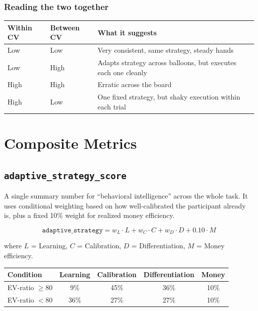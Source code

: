 \documentclass[11pt,a4paper]{article}
\begin{document}
\subsubsection*{Reading the two together}

\begin{table}[H]
\centering
\begin{tabular}{@{}lll@{}}
\toprule
\textbf{Within CV} & \textbf{Between CV} & \textbf{What it suggests} \\
\midrule
Low  & Low  & Very consistent, same strategy, steady hands \\
Low  & High & Adapts strategy across balloons, but executes each one cleanly \\
High & High & Erratic across the board \\
High & Low  & One fixed strategy, but shaky execution within each trial \\
\bottomrule
\end{tabular}
\end{table}


\section{Composite Metrics}

\subsection{\texttt{adaptive\_strategy\_score}}

A single summary number for ``behavioral intelligence'' across the whole
task. It uses conditional weighting based on how well-calibrated the
participant already is, plus a fixed 10\% weight for realized money
efficiency.

\begin{equation}
\boxed{
\texttt{adaptive\_strategy} =
w_L \!\cdot\! L
+ w_C \!\cdot\! C
+ w_D \!\cdot\! D
+ 0.10 \!\cdot\! M
}
\end{equation}

where $L$ = Learning, $C$ = Calibration, $D$ = Differentiation, $M$ = Money efficiency.

\begin{table}[H]
\centering\small
\begin{tabular}{@{}lcccc@{}}
\toprule
\textbf{Condition} & \textbf{Learning} & \textbf{Calibration} & \textbf{Differentiation} & \textbf{Money} \\
\midrule
EV-ratio $\geq 80$ & 9\% & 45\% & 36\% & 10\% \\
EV-ratio $< 80$    & 36\% & 27\% & 27\% & 10\% \\
\bottomrule
\end{tabular}
\end{table}
\end{document}
